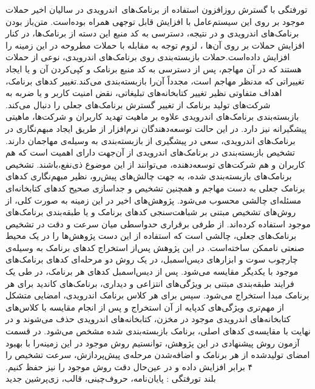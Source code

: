 


‌تورفتگی
‫با گسترش روزافزون استفاده از برنامک‌های\ اندرویدی  در سالیان اخیر حملات موجود بر روی این سیستم‌عامل با افزایش قابل توجهی همراه بوده‌است. متن‌باز بودن برنامک‌های اندرویدی و در نتیجه، دسترسی به کد منبع این دسته از برنامک‌ها، در کنار افزایش حملات بر روی آن‌ها ، لزوم توجه به مقابله با حملات مطروحه در این زمینه‌ را افزایش داده‌است.حملات بازبسته‌بندی روی برنامک‌های اندرویدی، نوعی از حملات هستند که در آن مهاجم، پس از دسترسی به کد منبع برنامک و کپی‌کردن آن و یا ایجاد تغییراتی که مدنظر مهاجم است، مجدداً آن‌را بازبسته‌بندی می‌کند.تغییر کد‌های برنامک، اهداف متفاوتی نظیر تغییر کتابخانه‌های تبلیغاتی، نقض امنیت کاربر و یا ضربه به شرکت‌های تولید برنامک‌ از تغییر گسترش برنامک‌های جعلی را دنبال می‌کند. بازبسته‌بندی برنامک‌های اندرویدی علاوه بر ماهیت تهدید کاربران و شرکت‌ها، ماهیتی پیشگیرانه نیز دارد. در این حالت توسعه‌دهندگان نرم‌افزار از طریق ایجاد مبهم‌نگاری در برنامک‌های اندرویدی، سعی در پیشگیری از بازبسته‌بندی به وسیله‌ی مهاجمان دارند. تشخیص بازبسته‌بندی در برنامک‌های اندرویدی از آن‌جهت دارا‌ی اهمیت است که هم کاربران و هم شرکت‌های توسعه‌دهنده، می‌توانند از این موضوع ذی‌نفع،باشند. تشخیص‌ برنامک‌های بازبسته‌بندی شده، به جهت چالش‌های پیش‌رو، نظیر مبهم‌نگاری کد‌های برنامک‌‌ جعلی به دست مهاجم و همچنین تشخیص و جداسازی صحیح کد‌های کتابخانه‌ای مسئله‌ای چالشی محسوب می‌شود. پژوهش‌های اخیر در این زمینه به صورت کلی، از روش‌‌های تشخیص مبتنی بر شباهت‌سنجی کد‌های برنامک و یا طبقه‌بندی برنامک‌های موجود استفاده‌ کرده‌اند. از طرفی برقراری حد‌واسطی میان سرعت‌ و دقت در تشخیص برنامک‌های جعلی، چالشی است که استفاده از این دست پژوهش‌ها را در یک محیط صنعتی ناممکن ساخته‌است. در این پژوهش پس‌از استخراج کد‌های برنامک به وسیله‌ی چارچوب سوت و ابزار‌های دیس‌اسمبل، در یک روش دو مرحله‌ای کد‌های برنامک‌های موجود با یکدیگر مقایسه می‌شود. پس از دیس‌اسمبل کد‌های هر برنامک، در طی یک فرایند طبقه‌بندی مبتنی بر ویژگی‌های انتزاعی و دیداری، برنامک‌های کاندید برای هر برنامک مبدا استخراج می‌شود. سپس برای هر کلاس برنامک‌ اندرویدی، امضایی متشکل از مهم‌تری ویژگی‌های کد‌پایه از آن استخراج و پس از انجام مقایسه‌ با کلاس‌های کتابخانه‌های اندرویدی موجود در مخزن، کتابخانه‌های اندرویدی حذف می‌شوند و در نهایت با مقایسه‌ی کد‌های اصلی، برنامک‌ بازبسته‌بندی‌ شده مشخص می‌شود.
در قسمت آزمون روش پیشنهادی در این پژوهش، توانستیم روش موجود در این زمینه‌را با بهبود امضا‌ی تولید‌شده از هر برنامک و اضافه‌شدن مرحله‌ی پیش‌پردازش، سرعت تشخیص را ۴ برابر افزایش داده و در عین‌حال دقت روش موجود را نیز حفظ‌ کنیم.  
 \\
‌بلند
‌تورفتگی : 
پایان‌نامه، حروف‌چینی، قالب، زی‌پرشین
‌جدید